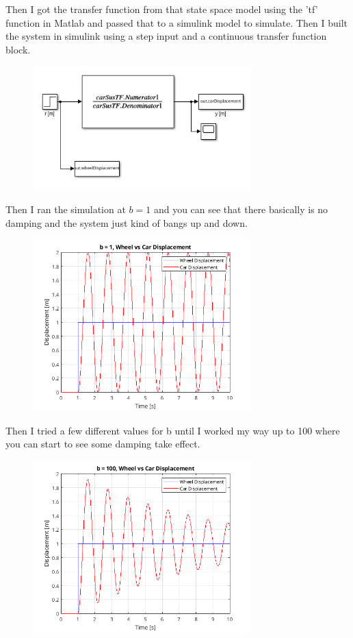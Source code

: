 \documentclass{article}
\begin{document}
Then I got the transfer function from that state space model using the 'tf' function in Matlab and passed that to a simulink model to simulate.
Then I built the system in simulink using a step input and a continuous transfer function block.

\begin{figure}[H]
    \centering
    \includegraphics[width=0.75\textwidth]{carSusSimModel.png}
\end{figure}

Then I ran the simulation at $b=1$ and you can see that there basically is no damping and the system just kind of bangs up and down.

\begin{figure}[H]
    \centering
    \includegraphics[width=0.75\textwidth]{b1sim.png}
\end{figure}

Then I tried a few different values for b until I worked my way up to 100 where you can start to see some damping take effect.

\begin{figure}[H]
    \centering
    \includegraphics[width=0.75\textwidth]{b100sim.png}
\end{figure}
\end{document}
